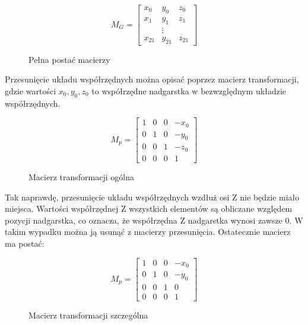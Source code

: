 \begin{figure}[H]
    \begin{equation}
        M_G = 
        \begin{bmatrix}
        x_0 & y_0 & z_0 \\
        x_1 & y_1 & z_1 \\
            & \vdots &     \\
        x_{21} & y_{21} & z_{21}
        \end{bmatrix}
    \end{equation}    
    \caption{Pełna postać macierzy}
\end{figure}

\quad Przesunięcie układu współrzędnych można opisać poprzez macierz transformacji, gdzie wartości ${x_0, y_0, z_0}$ to współrzędne nadgarstka w bezwzględnym układzie współrzędnych.  

\begin{figure}[H]
    \begin{equation}
        M_p = 
        \begin{bmatrix}
            1 & 0 & 0 & -x_0 \\
            0 & 1 & 0 & -y_0 \\
            0 & 0 & 1 & -z_0 \\
            0 & 0 & 0 & 1
        \end{bmatrix}
    \end{equation}
    \caption{Macierz transformacji ogólna}
\end{figure}


\quad Tak naprawdę, przesunięcie układu współrzędnych wzdłuż osi Z nie będzie miało miejsca. Wartości współrzędnej Z wszystkich elementów są obliczane względem pozycji nadgarstka, co oznacza, że współrzędna Z nadgarstka wynosi zawsze 0. W takim wypadku można ją usunąć z macierzy przesunięcia. Ostatecznie macierz ma postać:  

\begin{figure}[H]
    \begin{equation}
        M_p = 
        \begin{bmatrix}
        1 & 0 & 0 & -x_0 \\
        0 & 1 & 0 & -y_0 \\
        0 & 0 & 1 & 0 \\
        0 & 0 & 0 & 1
        \end{bmatrix}
    \end{equation}
    \caption{Macierz transformacji szczególna}
\end{figure}


